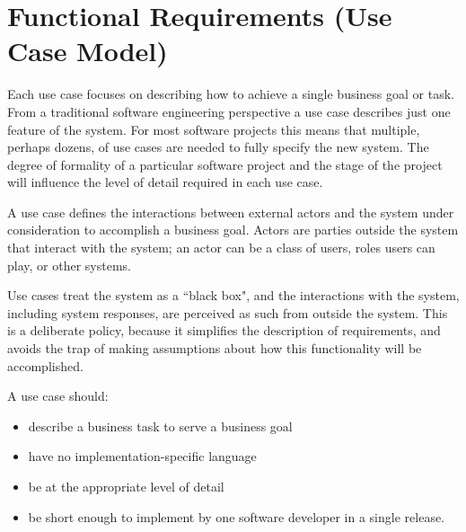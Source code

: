 \documentclass[
  american        %
]{sirrixreport}
\begin{document}
\section{Functional Requirements (Use Case Model)}
\label{sec:functional.requirements}

  Each use case focuses on describing how to achieve a single business
  goal or task. From a traditional software engineering perspective a
  use case describes just one feature of the system.  For most
  software projects this means that multiple, perhaps dozens, of use
  cases are needed to fully specify the new system.  The degree of
  formality of a particular software project and the stage of the
  project will influence the level of detail required in each use
  case.
 
  A use case defines the interactions between external actors and the
  system under consideration to accomplish a business goal. Actors are
  parties outside the system that interact with the system; an actor
  can be a class of users, roles users can play, or other systems.
 
  Use cases treat the system as a ``black box", and the interactions
  with the system, including system responses, are perceived as such
  from outside the system. This is a deliberate policy, because it
  simplifies the description of requirements, and avoids the trap of
  making assumptions about how this functionality will be
  accomplished.
 
  \noindent A use case should:
 
  \begin{itemize}
  \item describe a business task to serve a business goal
  \item have no implementation-specific language
  \item be at the appropriate level of detail
  \item be short enough to implement by one software developer in a
    single release.
 \end{itemize}

\end{document}
